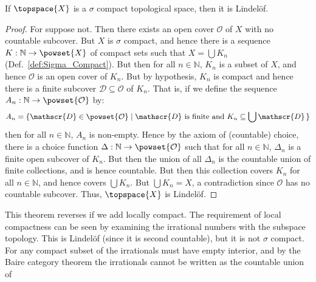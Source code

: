 \documentclass{article}                                                        %
\begin{document}
        \begin{theorem}
            \label{thm:Sigma_Compact_Implies_Lindelof}%
            If $\topspace{X}$ is a $\sigma$ compact topological space, then it
            is Lindel\"{o}f.
        \end{theorem}
        \begin{proof}
            For suppose not. Then there exists an open cover $\mathcal{O}$ of
            $X$ with no countable subcover. But $X$ is $\sigma$ compact, and
            hence there is a sequence $K:\mathbb{N}\rightarrow\powset{X}$ of
            compact sets such that $X=\bigcup{K}_{n}$
            (Def.~\ref{def:Sigma_Compact}). But then for all $n\in\mathbb{N}$,
            $K_{n}$ is a subset of $X$, and hence $\mathcal{O}$ is an open cover
            of $K_{n}$. But by hypothesis, $K_{n}$ is compact and hence there is
            a finite subcover $\mathscr{D}\subseteq\mathcal{O}$ of $K_{n}$. That
            is, if we define the sequence
            $A_{n}:\mathbb{N}\rightarrow\powset{\mathcal{O}}$ by:
            \begin{equation}
                A_{n}=\{\mathscr{D}\in\powset{\mathcal{O}}\;|\;
                    \mathscr{D}\textrm{ is finite and }
                    K_{n}\subseteq\bigcup\mathscr{D}\,\}
            \end{equation}
            then for all $n\in\mathbb{N}$, $A_{n}$ is non-empty. Hence by the
            axiom of (countable) choice, there is a choice function
            $\Delta:\mathbb{N}\rightarrow\powset{\mathcal{O}}$ such that for all
            $n\in\mathbb{N}$, $\Delta_{n}$ is a finite open subcover of $K_{n}$.
            But then the union of all $\Delta_{n}$ is the countable union of
            finite collections, and is hence countable. But then this collection
            covers $K_{n}$ for all $n\in\mathbb{N}$, and hence covers
            $\bigcup{K}_{n}$. But $\bigcup{K}_{n}=X$, a contradiction since
            $\mathcal{O}$ has no countable subcover. Thus, $\topspace{X}$ is
            Lindel\"{o}f.
        \end{proof}
        This theorem reverses if we add locally compact. The requirement of
        local compactness can be seen by examining the irrational numbers with
        the subspace topology. This is Lindel\"{o}f (since it is second
        countable), but it is not $\sigma$ compact. For any compact subset of
        the irrationals must have empty interior, and by the Baire category
        theorem the irrationals cannot be written as the countable union of
\end{document}
